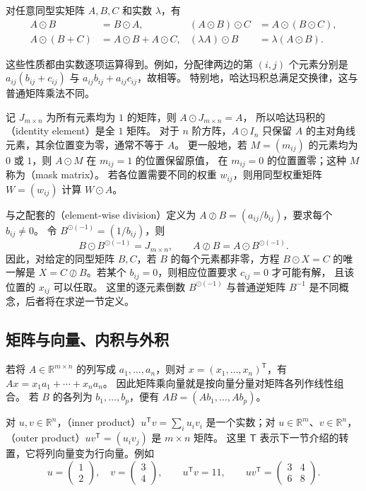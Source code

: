 \documentclass[UTF8,12pt,a4paper,fontset=fandol]{ctexart}
\begin{document}
\begin{property}[哈达玛积的运算律]
对任意同型实矩阵 $A,B,C$ 和实数 $\lambda$，有
\begin{align*}
  A\odot B&=B\odot A,&
  (A\odot B)\odot C&=A\odot(B\odot C),\\
  A\odot(B+C)&=A\odot B+A\odot C,&
  (\lambda A)\odot B&=\lambda(A\odot B).
\end{align*}
\end{property}

这些性质都由实数逐项运算得到。例如，分配律两边的第 $(i,j)$ 个元素分别是
$a_{ij}(b_{ij}+c_{ij})$ 与 $a_{ij}b_{ij}+a_{ij}c_{ij}$，故相等。
特别地，哈达玛积总满足交换律，这与普通矩阵乘法不同。

记 $J_{m\times n}$ 为所有元素均为 $1$ 的矩阵，则 $A\odot J_{m\times n}=A$，
所以哈达玛积的（identity element）是全 $1$ 矩阵。
对于 $n$ 阶方阵，$A\odot I_n$ 只保留 $A$ 的主对角线元素，其余位置变为零，通常不等于 $A$。
更一般地，若 $M=(m_{ij})$ 的元素均为 $0$ 或 $1$，则 $A\odot M$ 在 $m_{ij}=1$ 的位置保留原值，
在 $m_{ij}=0$ 的位置置零；这种 $M$ 称为（mask matrix）。
若各位置需要不同的权重 $w_{ij}$，则用同型权重矩阵 $W=(w_{ij})$ 计算 $W\odot A$。

与之配套的（element-wise division）定义为
$A\oslash B=(a_{ij}/b_{ij})$，要求每个 $b_{ij}\ne0$。
令 $B^{\odot(-1)}=(1/b_{ij})$，则
\[
  B\odot B^{\odot(-1)}=J_{m\times n},\qquad
  A\oslash B=A\odot B^{\odot(-1)}.
\]
因此，对给定的同型矩阵 $B,C$，若 $B$ 的每个元素都非零，方程 $B\odot X=C$ 的唯一解是
$X=C\oslash B$。若某个 $b_{ij}=0$，则相应位置要求 $c_{ij}=0$ 才可能有解，
且该位置的 $x_{ij}$ 可以任取。
这里的逐元素倒数 $B^{\odot(-1)}$ 与普通逆矩阵 $B^{-1}$ 是不同概念，后者将在求逆一节定义。

\subsection{矩阵与向量、内积与外积}

若将 $A\in\mathbb R^{m\times n}$ 的列写成 $a_1,\ldots,a_n$，则对
$x=(x_1,\ldots,x_n)^{\mathsf T}$，有 $Ax=x_1a_1+\cdots+x_na_n$。
因此矩阵乘向量就是按向量分量对矩阵各列作线性组合。
若 $B$ 的各列为 $b_1,\ldots,b_p$，便有 $AB=(Ab_1,\ldots,Ab_p)$。

对 $u,v\in\mathbb R^n$，（inner product）$u^{\mathsf T}v=\sum_i u_iv_i$
是一个实数；对 $u\in\mathbb R^m$、$v\in\mathbb R^n$，
（outer product）$uv^{\mathsf T}=(u_iv_j)$ 是 $m\times n$ 矩阵。
这里 $\mathsf T$ 表示下一节介绍的转置，它将列向量变为行向量。例如
\[
  u=\begin{pmatrix}1\\2\end{pmatrix},\quad
  v=\begin{pmatrix}3\\4\end{pmatrix},\qquad
  u^{\mathsf T}v=11,\qquad uv^{\mathsf T}=\begin{pmatrix}3&4\\6&8\end{pmatrix}.
\]
\end{document}
